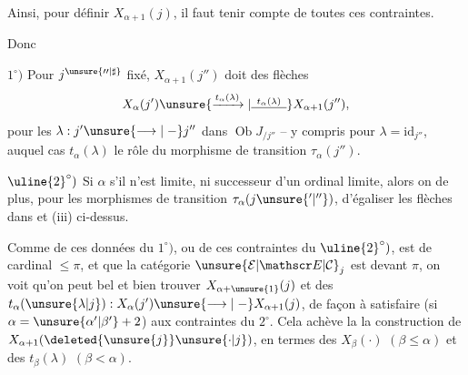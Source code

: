 Ainsi, pour définir  $X_{\alpha+1}(j)$, il faut  tenir compte de toutes ces contraintes.

Donc

$1^\circ)$ Pour $j^{\unsure{\prime\prime|\sharp}}$ fixé, $X_{\alpha+1}(j'')$ doit  des flèches
\[
 X_\alpha(j') \unsure{\xrightarrow{t_\alpha(\lambda)}|\overset{t_\alpha(\lambda)}{\rule{2.8em}{0.4pt}}} X_{\alpha+1}(j''),
\]
pour les $\lambda:j'\unsure{\longrightarrow|\mathrel{-}}j''$ dans $\operatorname{Ob}J_{/j''}$ -- y compris pour $\lambda=\mathrm{id}_{j''}$, auquel cas $t_\alpha(\lambda)$  le rôle du morphisme de transition $\tau_\alpha(j'')$.

$\uline{2}^\circ)$ Si $\alpha$     s'il n'est   limite, ni  successeur d'un ordinal limite, alors on  de plus, pour les morphismes de transition $\tau_\alpha(j\unsure{'|''})$,  d'égaliser les  flèches  dans  et (iii) ci-dessus.

Comme  de ces données du $1^\circ)$, ou de ces contraintes du $\uline{2}^\circ)$,
est de cardinal $\leq\pi$, et que la catégorie $\unsure{\mathcal E|\mathscr E|\mathcal C}_j$ est  devant $\pi$, on voit qu'on peut bel et bien trouver $X_{\alpha+\unsure{1}}(j)$ et des $t_\alpha(\unsure{\lambda|j}):X_\alpha(j')\unsure{\longrightarrow|\mathrel{-}}X_{\alpha+1}(j)$, de façon à satisfaire (si $\alpha=\unsure{\alpha'|\beta'}+2$) aux contraintes  du $2^\circ$. Cela achève la  la construction de $X_{\alpha+1}(\deleted{\unsure{j}}\unsure{\cdot|j})$, en termes des  $X_\beta(\cdot)$ $(\beta\leq\alpha)$ et des $t_\beta(\lambda)$ $(\beta<\alpha)$.

